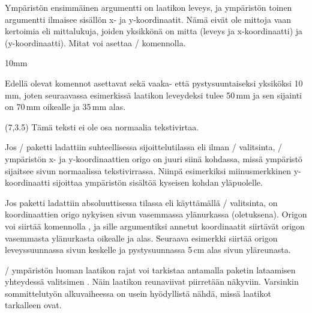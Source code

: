 \noindent
Ympäristön ensimmäinen argumentti  on laatikon leveys, ja
ympäristön toinen argumentti  ilmaisee sisällön x- ja
y-koordinaatit. Nämä eivät ole mittoja vaan kertoimia eli mittalukuja,
joiden yksikkönä on mitta  (leveys ja
x-koordinaatti) ja  (y-koordinaatti). Mitat voi
asettaa \-/ komennolla.

\begin{koodilohkosis}
\setlength{\TPHorizModule}{10mm}  %
\setlength{\TPVertModule} {10mm}  %
\end{koodilohkosis}

\noindent
Edellä olevat komennot asettavat sekä vaaka- että pystysuuntaiseksi
yksiköksi 10\,mm, joten seuraavassa esimerkissä laatikon leveydeksi
tulee 50\,mm ja sen sijainti on 70\,mm oikealle ja 35\,mm alas.

\begin{koodilohkosis}
\begin{textblock}{5}(7,3.5)
  Tämä teksti ei ole osa normaalia tekstivirtaa.
\end{textblock}
\end{koodilohkosis}

\noindent
Jos \-/ paketti ladattiin suhteellisessa
sijoittelutilassa eli ilman \-/ valitsinta,
\-/ ympäristön x- ja y-koordinaattien origo on
juuri siinä kohdassa, missä ympäristö sijaitsee sivun normaalissa
tekstivirrassa. Niinpä esimerkiksi miinusmerkkinen y-koordinaatti
sijoittaa ympäristön sisältöä kyseisen kohdan yläpuolelle.

Jos paketti ladattiin absoluuttisessa tilassa eli käyttämällä
\-/ valitsinta, on koordinaattien origo nykyisen sivun
vasemmassa ylänurkassa (oletuksena). Origon voi siirtää komennolla
, ja sille argumentiksi annetut koordinaatit
siirtävät origon vasemmasta ylänurkasta oikealle ja alas. Seuraava
esimerkki siirtää origon leveyssuunnassa sivun keskelle ja
pystysuunnassa 5\,cm alas sivun yläreunasta.

\begin{koodilohkosis}
\textblockorigin{.5\paperwidth}{5cm}
\end{koodilohkosis}

\noindent
{}\-/ ympäristön luoman laatikon rajat voi tarkistaa
antamalla paketin lataamisen yhteydessä valitsimen .
Näin laatikon reunaviivat piirretään näkyviin. Varsinkin sommittelutyön
alkuvaiheessa on usein hyödyllistä nähdä, missä laatikot tarkalleen
ovat.

